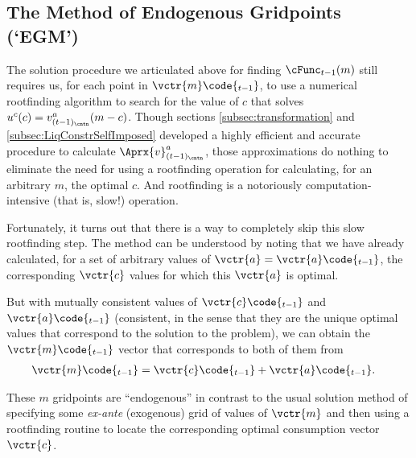 \hypertarget{the-method-of-endogenous-gridpoints}{}
\subsection{The Method of Endogenous Gridpoints (`EGM')}\label{subsec:egm}

The solution procedure we articulated above for finding $\cFunc_{t-1}(m)$ still requires us, for each point in $\vctr{m}\code{_{t-1}}$, to use a numerical rootfinding algorithm to search for the value of $c$ that solves $u^{c}(c) = v^{a}_{(t-1)_\cntn}(m-c)$.  Though sections \ref{subsec:transformation} and \ref{subsec:LiqConstrSelfImposed} developed a highly efficient and accurate procedure to calculate $\Aprx{v}^{a}_{(t-1)_\cntn}$, those approximations do nothing to eliminate the need for using a rootfinding operation for calculating, for an arbitrary $m$, the optimal $c$.  And rootfinding is a notoriously computation-intensive (that is, slow!) operation.

Fortunately, it turns out that there is a way to completely skip this slow rootfinding step.  The method can be understood by noting that we have already calculated, for a set of arbitrary values of $\vctr{a}=\vctr{a}\code{_{t-1}}$, the corresponding $\vctr{c}$ values for which this $\vctr{a}$ is optimal.


But with mutually consistent values of $\vctr{c}\code{_{t-1}}$ and $\vctr{a}\code{_{t-1}}$ (consistent, in the sense that they are the unique optimal values that correspond to the solution to the problem), we can obtain the $\vctr{m}\code{_{t-1}}$ vector that corresponds to both of them from
\begin{equation}\begin{gathered}\begin{aligned}
      \vctr{m}\code{_{t-1}}  & = {\vctr{c}\code{_{t-1}}+\vctr{a}\code{_{t-1}}}.
    \end{aligned}\end{gathered}\end{equation}


These $m$ gridpoints are ``endogenous'' in contrast to the usual solution method of specifying some \textit{ex-ante} (exogenous) grid of values of $\vctr{m}$ and then using a rootfinding routine to locate the corresponding optimal consumption vector $\vctr{c}$.



